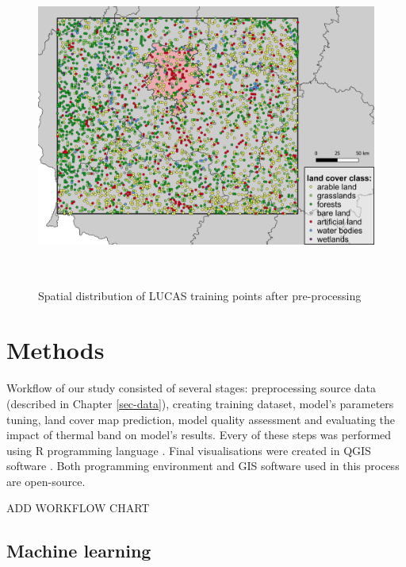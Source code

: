\documentclass{amuthesis}
\begin{document}
\begin{figure}[t]

{\centering \includegraphics[width=1\textwidth,height=4.16667in]{./figures/lucas_distribution.png}

}

\caption{\label{fig-rycina3}Spatial distribution of LUCAS training
points after pre-processing}

\end{figure}


\hypertarget{sec-methods}{%
\chapter{Methods}\label{sec-methods}}

Workflow of our study consisted of several stages: preprocessing source
data (described in Chapter \ref{sec-data}), creating training dataset,
model's parameters tuning, land cover map prediction, model quality
assessment and evaluating the impact of thermal band on model's results.
Every of these steps was performed using R programming language
\autocite{R-base}. Final visualisations were created in QGIS software
\autocite{QGIS_software}. Both programming environment and GIS software
used in this process are open-source.

ADD WORKFLOW CHART

\hypertarget{sec-ml}{%
\section{Machine learning}\label{sec-ml}}
\end{document}

